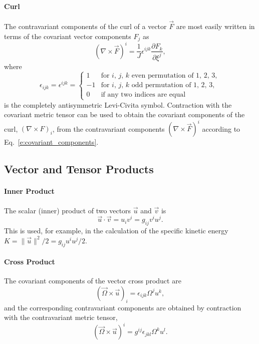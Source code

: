 \documentclass{report}
\begin{document}
\paragraph{Curl} The contravariant components of the curl of a vector $\vec{F}$ are most easily written in terms of the covariant vector components $F_j$ as
\begin{equation}
(\nabla \times \vec{F})^i = \frac{1}{J} \epsilon^{ijk} \frac{\partial F_k}{\partial \xi^j},
\end{equation}
where  
\[
\epsilon_{ijk} = \epsilon^{ijk} = 
\begin{cases}
1 & \text{for $i$, $j$, $k$ even permutation of 1, 2, 3},\\
-1 & \text{for $i$, $j$, $k$ odd permutation of 1, 2, 3},\\
0 & \text{if any two indices are equal}
\end{cases}
\]
is the completely antisymmetric Levi-Civita symbol. Contraction with the covariant metric tensor can be used to obtain the covariant components of the curl, $(\nabla \times F)_i$, from the contravariant components $(\nabla \times \vec{F})^i$ according to  Eq.~\eqref{e:covariant_components}.

\subsection{Vector and Tensor Products}

\paragraph{Inner Product} The scalar (inner) product of two vectors $\vec{u}$ and $\vec{v}$ is 
\begin{equation}
\vec{u} \cdot \vec{v} = u_i v^i = g_{ij} v^i u^j.
\end{equation}
This is used, for example, in the calculation of the specific kinetic energy $K = \| \vec{u} \|^2/2 = g_{ij} u^i u^j/2$.

\paragraph{Cross Product}
The covariant components of the vector cross product are
\begin{equation}
(\vec{\Omega} \times \vec{u})_i = \epsilon_{ijk} \Omega^j u^k,
\end{equation}
and the corresponding contravariant components are obtained by contraction with the contravariant metric tensor,
\begin{equation}
(\vec{\Omega} \times \vec{u})^i = g^{ij} \epsilon_{jkl} \Omega^k u^l.
\end{equation}
\end{document}
